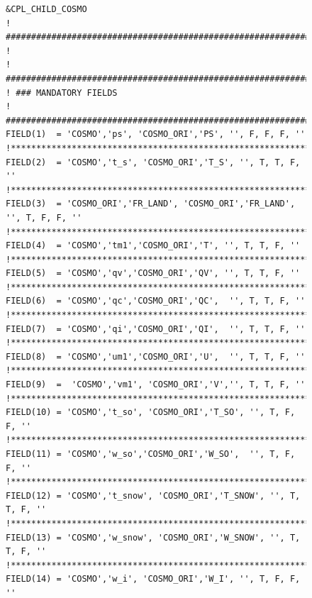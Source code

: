 \documentclass[11pt,twoside]{article}
\newcommand{\blockcode}{\ttfamily\color{OliveGreen}\par}
\begin{document}
\begin{figure}
\footnotesize
{\blockcode
\begin{verbatim} 
&CPL_CHILD_COSMO
! ###############################################################################
!
! ###############################################################################
! ### MANDATORY FIELDS
! ###############################################################################
FIELD(1)  = 'COSMO','ps', 'COSMO_ORI','PS', '', F, F, F, ''
!********************************************************************************
FIELD(2)  = 'COSMO','t_s', 'COSMO_ORI','T_S', '', T, T, F, ''
!********************************************************************************
FIELD(3)  = 'COSMO_ORI','FR_LAND', 'COSMO_ORI','FR_LAND', '', T, F, F, ''
!********************************************************************************
FIELD(4)  = 'COSMO','tm1','COSMO_ORI','T', '', T, T, F, ''
!********************************************************************************
FIELD(5)  = 'COSMO','qv','COSMO_ORI','QV', '', T, T, F, ''
!********************************************************************************
FIELD(6)  = 'COSMO','qc','COSMO_ORI','QC',  '', T, T, F, ''
!********************************************************************************
FIELD(7)  = 'COSMO','qi','COSMO_ORI','QI',  '', T, T, F, ''
!********************************************************************************
FIELD(8)  = 'COSMO','um1','COSMO_ORI','U',  '', T, T, F, ''
!********************************************************************************
FIELD(9)  =  'COSMO','vm1', 'COSMO_ORI','V','', T, T, F, ''
!********************************************************************************
FIELD(10) = 'COSMO','t_so', 'COSMO_ORI','T_SO', '', T, F, F, ''
!********************************************************************************
FIELD(11) = 'COSMO','w_so','COSMO_ORI','W_SO',  '', T, F, F, ''
!********************************************************************************
FIELD(12) = 'COSMO','t_snow', 'COSMO_ORI','T_SNOW', '', T, T, F, ''
!********************************************************************************
FIELD(13) = 'COSMO','w_snow', 'COSMO_ORI','W_SNOW', '', T, T, F, ''
!********************************************************************************
FIELD(14) = 'COSMO','w_i', 'COSMO_ORI','W_I', '', T, F, F, ''

\end{verbatim}}
\end{figure}
\end{document}
